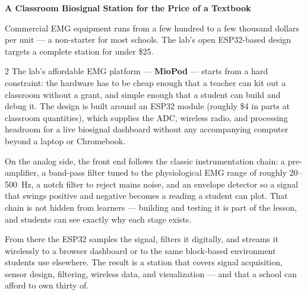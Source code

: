 \documentclass[10pt,letterpaper]{article}
\newcommand{\eyebrow}[1]{{\sffamily\bfseries\color{htilred}\fontsize{7.4}{9}\selectfont\textls[150]{\MakeUppercase{#1}}}\par\vspace{1.5pt}}
\newcommand{\hairline}{\noindent{\color{htilrule}\rule{\linewidth}{0.4pt}}\par}
\newcommand{\headsm}[1]{{\fontsize{17.5}{19}\selectfont\bfseries #1}\par\vspace{3pt}}
\newcommand{\standfirst}[1]{{\fontsize{12}{15}\selectfont #1}\par\vspace{5pt}}
\begin{document}
\clearpage
\eyebrow{Hardware \textperiodcentered\ MioPod}
\headsm{A Classroom Biosignal Station for the Price of a Textbook}
\standfirst{Commercial EMG equipment runs from a few hundred to a few thousand dollars per unit --- a non-starter for most schools. The lab's open ESP32-based design targets a complete station for under \$25.}
\hairline
\vspace{4pt}

\noindent
\begin{minipage}[t]{0.615\linewidth}
  \begin{multicols}{2}
  The lab's affordable EMG platform --- \textbf{MioPod} --- starts from a hard constraint: the hardware has to be cheap enough that a teacher can kit out a classroom without a grant, and simple enough that a student can build and debug it. The design is built around an ESP32 module (roughly \$4 in parts at classroom quantities), which supplies the ADC, wireless radio, and processing headroom for a live biosignal dashboard without any accompanying computer beyond a laptop or Chromebook.

  On the analog side, the front end follows the classic instrumentation chain: a pre-amplifier, a band-pass filter tuned to the physiological EMG range of roughly 20--500~Hz, a notch filter to reject mains noise, and an envelope detector so a signal that swings positive and negative becomes a reading a student can plot. That chain is not hidden from learners --- building and testing it is part of the lesson, and students can see exactly why each stage exists.

  From there the ESP32 samples the signal, filters it digitally, and streams it wirelessly to a browser dashboard or to the same block-based environment students use elsewhere. The result is a station that covers signal acquisition, sensor design, filtering, wireless data, and visualization --- and that a school can afford to own thirty of.
  \end{multicols}
\end{minipage}%
\hfill
\end{document}
